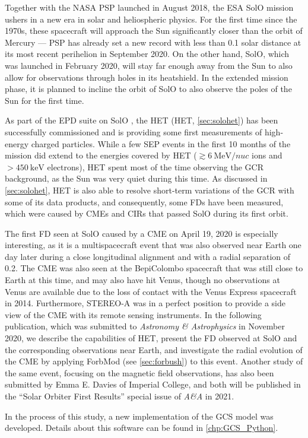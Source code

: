 Together with the NASA \ac{PSP} launched in August 2018, the ESA \ac{SolO} mission ushers in a new era in solar and heliospheric physics. For the first time since the 1970s, these spacecraft will approach the Sun significantly closer than the orbit of Mercury --- \ac{PSP} has already set a new record with less than \SI{0.1}{\AU} solar distance at its most recent perihelion in September 2020. On the other hand, \ac{SolO}, which was launched in February 2020, will stay far enough away from the Sun to also allow for observations through holes in its heatshield. In the extended mission phase, it is planned to incline the orbit of \ac{SolO} to also observe the poles of the Sun for the first time.

As part of the \ac{EPD} suite on \ac{SolO} \citep{RodriguezPacheco-2019-EPD}, the \acl{HET} (\acs{HET}, \autoref{sec:solohet}) has been successfully commissioned and is providing some first measurements of high-energy charged particles. While a few \ac{SEP} events in the first 10 months of the mission did extend to the energies covered by \ac{HET} ($\gtrsim\SI{6}{\mega\electronvolt\per nuc}$ ions and $>\SI{450}{\kilo\electronvolt}$ electrons), \ac{HET} spent most of the time observing the \ac{GCR} background, as the Sun was very quiet during this time. As discussed in \autoref{sec:solohet}, \ac{HET} is also able to resolve short-term variations of the \ac{GCR} with some of its data products, and consequently, some \acp{FD} have been measured, which were caused by \acp{CME} and \acp{CIR} that passed \ac{SolO} during its first orbit.

The first \ac{FD} seen at \ac{SolO} caused by a \ac{CME} on April 19, 2020 is especially interesting, as it is a multispacecraft event that was also observed near Earth one day later during a close longitudinal alignment and with a radial separation of \SI{0.2}{\AU}. The \ac{CME} was also seen at the BepiColombo spacecraft that was still close to Earth at this time, and may also have hit Venus, though no observations at Venus are available due to the loss of contact with the Venus Express spacecraft in 2014. Furthermore, \acs{STEREO}-A was in a perfect position to provide a side view of the \ac{CME} with its remote sensing instruments. In the following publication, which was submitted to \textit{Astronomy \& Astrophysics} in November 2020, we describe the capabilities of \ac{HET}, present the \ac{FD} observed at \ac{SolO} and the corresponding observations near Earth, and investigate the radial evolution of the \ac{CME} by applying \acs{ForbMod} (see \autoref{sec:forbush}) to this event. Another study of the same event, focusing on the magnetic field observations, has also been submitted by Emma E. Davies of Imperial College, and both will be published in the ``Solar Orbiter First Results'' special issue of \textit{A\&A} in 2021.

In the process of this study, a new implementation of the \ac{GCS} model \citep{Thernisien-2011-GCS} was developed. Details about this software can be found in \autoref{chp:GCS_Python}.

